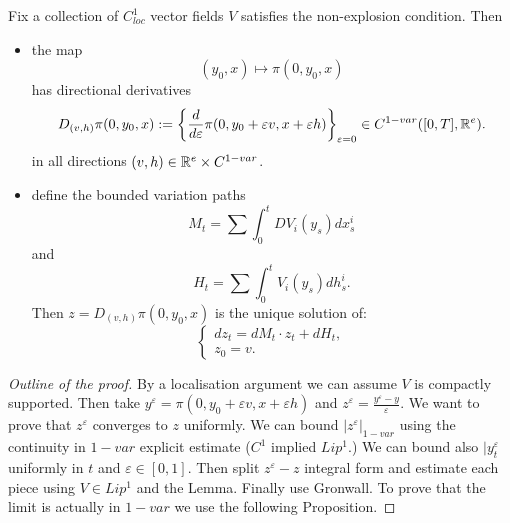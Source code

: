 \begin{theorem}\label{theo:directionalRS}
    Fix a collection of $C^1_{loc}$ vector fields $V$ satisfies the non-explosion condition.
    Then
    \begin{itemize}
        \item the map
        \begin{equation}
            (y_0, x) \mapsto \pi(0, y_0, x) 
        \end{equation}
        has directional derivatives
        \begin{equation}
            D_{(v,h)}\pi(0,y_0,x) := \left\{ \frac{d}{d\varepsilon} \pi(0, y_0 + \varepsilon v, x + \varepsilon h) \right\}_{\varepsilon = 0} \in C^{1-var}([0,T], \mathbb{R}^e).
        \end{equation}
        in all directions $(v,h) \in \mathbb{R}^e \times C^{1-var}$.
        \item define the bounded variation paths
        \begin{equation}
            M_t = \sum \int_0^t DV_i(y_s) dx^i_s
        \end{equation}
        and 
        \begin{equation}
            H_t = \sum \int_0^t V_i(y_s) dh^i_s.
        \end{equation}
        Then $z = D_{(v,h)}\pi(0,y_0,x)$ is the unique solution of:
        \begin{equation}
            \begin{cases}
                dz_t = dM_t \cdot z_t + dH_t,\\
                z_0 = v.
            \end{cases}
        \end{equation}
    \end{itemize}
\end{theorem}
\begin{proof}[Outline of the proof]
    By a localisation argument we can assume $V$ is compactly supported.
    Then take $y^\varepsilon = \pi(0, y_0 + \varepsilon v, x + \varepsilon h)$ and $z^\varepsilon = \frac{y^\varepsilon - y}{\varepsilon}.$
    We want to prove that $z^\varepsilon$ converges to $z$ uniformly.
    We can bound $|z^\varepsilon|_{1-var}$ using the continuity in $1-var$ explicit estimate ($C^1$ implied $Lip^1.$)
    We can bound also $|y_t^\varepsilon$ uniformly in $t$ and $\varepsilon \in [0,1].$
    Then split $z^\varepsilon - z$ integral form and estimate each piece using $V \in Lip^1$ and the Lemma.
    Finally use Gronwall.
    To prove that the limit is actually in $1-var$ we use the following Proposition.
\end{proof}

